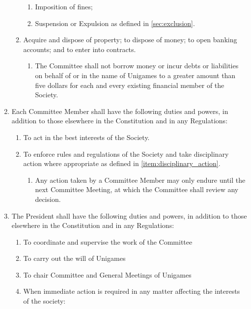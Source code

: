 \documentclass[a4paper]{article}
\begin{document}
\begin{enumerate}
\begin{enumerate}
\begin{enumerate}
                \item Imposition of fines;
                \item Suspension or Expulsion as defined in \cref{sec:exclusion}.
            \end{enumerate}
            \item Acquire and dispose of property; to dispose of money; to open banking accounts; and to enter into contracts.
            \begin{enumerate}
                \item The Committee shall not borrow money or incur debts or liabilities on behalf of or in the name of Unigames to a greater amount than five dollars for each and every existing financial member of the Society.
            \end{enumerate}
            \end{enumerate}
        \item Each Committee Member shall have the following duties and powers, in addition to those elsewhere in the Constitution and in any Regulations:
        \begin{enumerate}
            \item To act in the best interests of the Society.
            \item To enforce rules and regulations of the Society and take disciplinary action where appropriate as defined in \cref{item:disciplinary_action}.
            \begin{enumerate}
                \item Any action taken by a Committee Member may only endure until the next Committee Meeting, at which the Committee shall review any decision.
            \end{enumerate}
        \end{enumerate}
        \item \label{item:pres_duties} The President shall have the following duties and powers, in addition to those elsewhere in the Constitution and in any Regulations:
              \begin{enumerate}
                  \item To coordinate and supervise the work of the Committee
                  \item To carry out the will of Unigames
                  \item To chair Committee and General Meetings of Unigames
                  \item When immediate action is required in any matter affecting the interests of the society:

\end{enumerate}
\end{enumerate}
\end{document}
